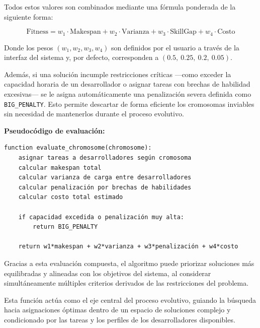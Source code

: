 Todos estos valores son combinados mediante una fórmula ponderada de la siguiente forma:

\[
    \text{Fitness} = w_1 \cdot \text{Makespan} + w_2 \cdot \text{Varianza} + w_3 \cdot \text{SkillGap} + w_4 \cdot \text{Costo}
\]

Donde los pesos $(w_1, w_2, w_3, w_4)$ son definidos por el usuario a través de la interfaz del sistema y, por defecto, corresponden a $(0.5,\ 0.25,\ 0.2,\ 0.05)$.

Además, si una solución incumple restricciones críticas —como exceder la capacidad horaria de un desarrollador o asignar tareas con brechas de habilidad excesivas— se le asigna automáticamente una penalización severa definida como \texttt{BIG\_PENALTY}. Esto permite descartar de forma eficiente los cromosomas inviables sin necesidad de mantenerlos durante el proceso evolutivo.

\noindent\textbf{Pseudocódigo de evaluación:}

\begin{verbatim}
function evaluate_chromosome(chromosome):
    asignar tareas a desarrolladores según cromosoma
    calcular makespan total
    calcular varianza de carga entre desarrolladores
    calcular penalización por brechas de habilidades
    calcular costo total estimado

    if capacidad excedida o penalización muy alta:
        return BIG_PENALTY

    return w1*makespan + w2*varianza + w3*penalización + w4*costo
\end{verbatim}

Gracias a esta evaluación compuesta, el algoritmo puede priorizar soluciones más equilibradas y alineadas con los objetivos del sistema, al considerar simultáneamente múltiples criterios derivados de las restricciones del problema.

Esta función actúa como el eje central del proceso evolutivo, guiando la búsqueda hacia asignaciones óptimas dentro de un espacio de soluciones complejo y condicionado por las tareas y los perfiles de los desarrolladores disponibles.



